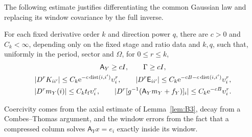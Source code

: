 The following estimate justifies differentiating the common Gaussian law and replacing its window covariance by the full inverse.
\begin{lemma}\label{lem:B-windows}
For each fixed derivative order $k$ and direction power $q$, there are $c>0$ and $C_k<\infty$, depending only on the fixed stage and ratio data and $k,q$, such that, uniformly in the period, sector and $\Omega$, for $0\le r\le k$,
\begin{gather*}
\mathsf A_Y\ge cI,\qquad\Gamma\ge cI,\\
|D^rK_{ii'}|\le C_k\mathrm e^{-c\operatorname{dist}(i,i')}\upsilon_i^r,\qquad
|D^r\mathsf E_{ii'}|\le C_k\mathrm e^{-cB-c\operatorname{dist}(i,i')}\upsilon_i^r,\\
|D^rm_Y(i)|\le C_kt_{\rm f}\upsilon_i^r,\qquad
|D^r[g^{-1}(\mathsf A_Ym_Y+f_Y)]_i|\le C_k\mathrm e^{-cB}\upsilon_i^r.
\end{gather*}
\end{lemma}
Coercivity comes from the axial estimate of Lemma~\ref{lem:B3}, decay from a Combes--Thomas argument, and the window errors from the fact that a compressed column solves $\mathsf A_Yx=e_i$ exactly inside its window.
